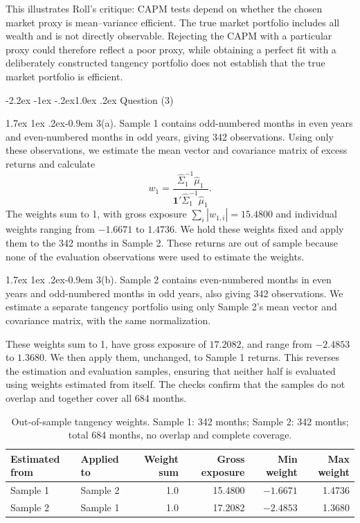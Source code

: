 \documentclass[11pt]{article}
\makeatletter
\renewcommand\subsection{\@startsection{subsection}{2}{0pt}%
  {-2.2ex \@plus -1ex \@minus -.2ex}{1.0ex \@plus .2ex}%
  {\normalfont\bfseries\normalsize\color{psink}}}
\renewcommand\paragraph{\@startsection{paragraph}{4}{0pt}%
  {1.7ex \@plus 1ex \@minus .2ex}{-0.9em}%
  {\normalfont\bfseries\normalsize\color{psink}}}
\makeatother
\begin{document}
This illustrates Roll's critique: CAPM tests depend on whether the chosen
market proxy is mean--variance efficient. The true market portfolio includes
all wealth and is not directly observable. Rejecting the CAPM with a particular
proxy could therefore reflect a poor proxy, while obtaining a perfect fit with
a deliberately constructed tangency portfolio does not establish that the true
market portfolio is efficient.

\subsection{Question (3)}

\paragraph{3(a).} Sample 1 contains odd-numbered months in even years and
even-numbered months in odd years, giving 342 observations. Using only these
observations, we estimate the mean vector and covariance matrix of excess
returns and calculate
\[
w_1 = \frac{\hat\Sigma_1^{-1}\hat\mu_1}{\mathbf{1}'\hat\Sigma_1^{-1}\hat\mu_1}.
\]
The weights sum to 1, with gross exposure $\sum_i |w_{1,i}| = 15.4800$ and
individual weights ranging from $-1.6671$ to $1.4736$. We hold these weights
fixed and apply them to the 342 months in Sample 2. These returns are out of
sample because none of the evaluation observations were used to estimate the
weights.

\paragraph{3(b).} Sample 2 contains even-numbered months in even years and
odd-numbered months in odd years, also giving 342 observations. We estimate a
separate tangency portfolio using only Sample 2's mean vector and covariance
matrix, with the same normalization.

These weights sum to 1, have gross exposure of $17.2082$, and range from
$-2.4853$ to $1.3680$. We then apply them, unchanged, to Sample 1 returns. This
reverses the estimation and evaluation samples, ensuring that neither half is
evaluated using weights estimated from itself. The checks confirm that the
samples do not overlap and together cover all 684 months.

\begin{table}[H]
\centering
\caption{Out-of-sample tangency weights. Sample 1: 342 months; Sample 2: 342
months; total 684 months, no overlap and complete coverage.}
\small
\begin{tabular}{llrrrr}
\toprule
Estimated from & Applied to & Weight sum & Gross exposure & Min weight & Max weight \\
\midrule
Sample 1 & Sample 2 & 1.0 & 15.4800 & $-1.6671$ & 1.4736 \\
Sample 2 & Sample 1 & 1.0 & 17.2082 & $-2.4853$ & 1.3680 \\
\bottomrule
\end{tabular}
\label{tab:p2oosw}
\end{table}
\end{document}
